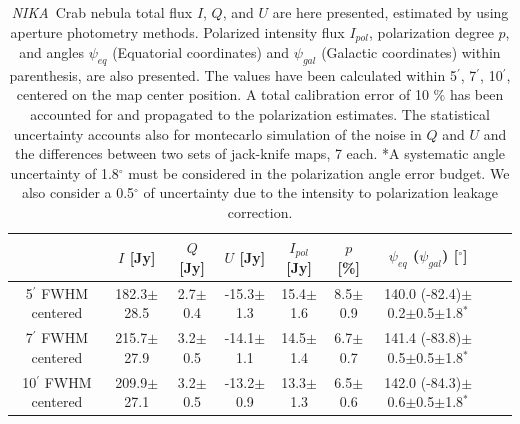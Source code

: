 \documentclass[twocolumn,traditabstract]{aa}
\def\NIKA{\textit{NIKA}}
\begin{document}
\begin{table}[h!]
  \centering
      \begin{tabular}{ccccccccc}
      \hline
      \hline
       & \small $I$ [Jy] & \small $Q$ [Jy] & \small $U$ [Jy] & \small $I_{pol}$ [Jy] & \small $p$ [\%] & \small $\psi_{eq}$ ($\psi_{gal}$) [$^\circ$] \\
      \hline



\small 5$^{\prime}$ FWHM centered & \small 182.3$\pm$28.5 & \small 2.7$\pm$0.4 & \small -15.3$\pm$1.3 & \small 15.4$\pm$1.6 & \small 8.5$\pm$0.9 & \small 140.0 (-82.4)$\pm$0.2$\pm$0.5$\pm$1.8$^*$  \\ 
\small 7$^{\prime}$ FWHM centered & \small 215.7$\pm$27.9 & \small 3.2$\pm$0.5 & \small -14.1$\pm$1.1 & \small 14.5$\pm$1.4 & \small 6.7$\pm$0.7 & \small 141.4 (-83.8)$\pm$0.5$\pm$0.5$\pm$1.8$^*$ \\ 
\small 10$^{\prime}$ FWHM centered & \small 209.9$\pm$27.1 & \small 3.2$\pm$0.5 & \small -13.2$\pm$0.9 & \small 13.3$\pm$1.3 & \small 6.5$\pm$0.6 & \small 142.0 (-84.3)$\pm$0.6$\pm$0.5$\pm$1.8$^*$ \\ 
\hline            
    \hline   
    \end{tabular}
   \caption{ 
   \NIKA\ Crab nebula total flux $I$, $Q$, and $U$ are here presented, estimated by using aperture photometry methods. Polarized intensity flux $I_{pol}$, polarization degree $p$, and angles $\psi_{eq}$ (Equatorial coordinates) and $\psi_{gal}$ (Galactic coordinates) within parenthesis, are also presented. The values have been calculated within 5$^{\prime}$, 7$^{\prime}$, 10$^{\prime}$, centered on the map center position.
   A total calibration error of 10 $\%$ has been accounted for and propagated to the polarization estimates. The statistical uncertainty accounts also for montecarlo simulation of the noise in $Q$ and $U$ and the differences between two sets of jack-knife maps, 7 each.
 *A systematic angle uncertainty of 1.8$^{\circ}$ must be considered in the polarization angle error budget. We also consider a 0.5$^{\circ}$ of uncertainty due to the intensity to polarization leakage correction.    
    }
    \label{tab:crab_results}
 \end{table}
\end{document}
